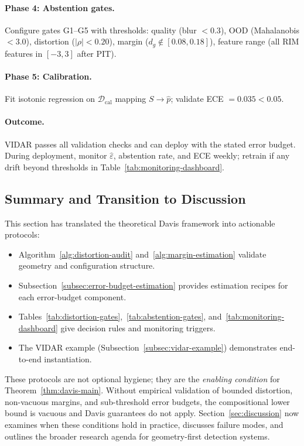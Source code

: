 \documentclass[11pt]{article}
\begin{document}
\paragraph{Phase 4: Abstention gates.}
Configure gates G1--G5 with thresholds: quality (blur $< 0.3$), OOD (Mahalanobis $< 3.0$), distortion ($|\rho| < 0.20$), margin ($d_g \notin [0.08, 0.18]$), feature range (all RIM features in $[-3,3]$ after PIT).

\paragraph{Phase 5: Calibration.}
Fit isotonic regression on $\mathcal{D}_{\mathrm{cal}}$ mapping $S \to \hat p$; validate ECE $= 0.035 < 0.05$.

\paragraph{Outcome.}
VIDAR passes all validation checks and can deploy with the stated error budget. During deployment, monitor $\hat\varepsilon$, abstention rate, and ECE weekly; retrain if any drift beyond thresholds in Table~\ref{tab:monitoring-dashboard}.

\subsection{Summary and Transition to Discussion}

This section has translated the theoretical Davis framework into actionable protocols:
\begin{itemize}[leftmargin=*]
  \item Algorithm~\ref{alg:distortion-audit} and~\ref{alg:margin-estimation} validate geometry and configuration structure.
  \item Subsection~\ref{subsec:error-budget-estimation} provides estimation recipes for each error-budget component.
  \item Tables~\ref{tab:distortion-gates},~\ref{tab:abstention-gates}, and~\ref{tab:monitoring-dashboard} give decision rules and monitoring triggers.
  \item The VIDAR example (Subsection~\ref{subsec:vidar-example}) demonstrates end-to-end instantiation.
\end{itemize}

These protocols are not optional hygiene; they are the \emph{enabling condition} for Theorem~\ref{thm:davis-main}. Without empirical validation of bounded distortion, non-vacuous margins, and sub-threshold error budgets, the compositional lower bound is vacuous and Davis guarantees do not apply. Section~\ref{sec:discussion} now examines when these conditions hold in practice, discusses failure modes, and outlines the broader research agenda for geometry-first detection systems.
\end{document}
